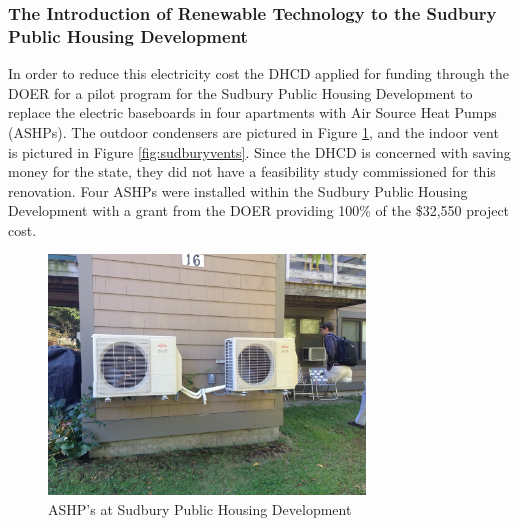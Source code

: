 \subsubsection{The Introduction of Renewable Technology to the Sudbury Public Housing Development}
\par In order to reduce this electricity cost the DHCD applied for funding through the DOER for a pilot program for the Sudbury Public Housing Development to replace the electric baseboards in four apartments with Air Source Heat Pumps (ASHPs). The outdoor condensers are pictured in Figure \ref{fig:sudburyashps}, and the indoor vent is pictured in Figure \ref{fig:sudburyvents}. Since the DHCD is concerned with saving money for the state, they did not have a feasibility study commissioned for this renovation. Four ASHPs were installed within the Sudbury Public Housing Development with a grant from the DOER providing 100\% of the \$32,550 project cost.
\begin{figure}[H]
\centering
\includegraphics[width=0.75\textwidth]{findingschapter/sudburyoutsideunits}
\caption{ASHP’s at Sudbury Public Housing Development}
\label{fig:sudburyashps}
\end{figure}

